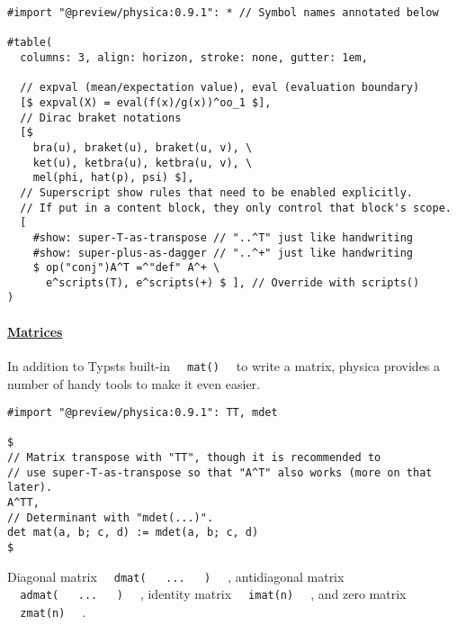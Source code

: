 \pandocbounded{}

\begin{verbatim}
#import "@preview/physica:0.9.1": * // Symbol names annotated below

#table(
  columns: 3, align: horizon, stroke: none, gutter: 1em,

  // expval (mean/expectation value), eval (evaluation boundary)
  [$ expval(X) = eval(f(x)/g(x))^oo_1 $],
  // Dirac braket notations
  [$
    bra(u), braket(u), braket(u, v), \
    ket(u), ketbra(u), ketbra(u, v), \
    mel(phi, hat(p), psi) $],
  // Superscript show rules that need to be enabled explicitly.
  // If put in a content block, they only control that block's scope.
  [
    #show: super-T-as-transpose // "..^T" just like handwriting
    #show: super-plus-as-dagger // "..^+" just like handwriting
    $ op("conj")A^T =^"def" A^+ \
      e^scripts(T), e^scripts(+) $ ], // Override with scripts()
)
\end{verbatim}

\pandocbounded{}

\paragraph{\texorpdfstring{\hyperref[matrices]{Matrices}}{Matrices}}\label{matrices}

In addition to Typst\textquotesingle s built-in
\texttt{\ }{\texttt{\ mat()\ }}\texttt{\ } to write a matrix, physica
provides a number of handy tools to make it even easier.

\begin{verbatim}
#import "@preview/physica:0.9.1": TT, mdet

$
// Matrix transpose with "TT", though it is recommended to
// use super-T-as-transpose so that "A^T" also works (more on that later).
A^TT,
// Determinant with "mdet(...)".
det mat(a, b; c, d) := mdet(a, b; c, d)
$
\end{verbatim}

\pandocbounded{}

Diagonal matrix
\texttt{\ }{\texttt{\ dmat(\ }}\texttt{\ }{\texttt{\ ...\ }}\texttt{\ }{\texttt{\ )\ }}\texttt{\ }
, antidiagonal matrix
\texttt{\ }{\texttt{\ admat(\ }}\texttt{\ }{\texttt{\ ...\ }}\texttt{\ }{\texttt{\ )\ }}\texttt{\ }
, identity matrix \texttt{\ }{\texttt{\ imat(n)\ }}\texttt{\ } , and
zero matrix \texttt{\ }{\texttt{\ zmat(n)\ }}\texttt{\ } .


